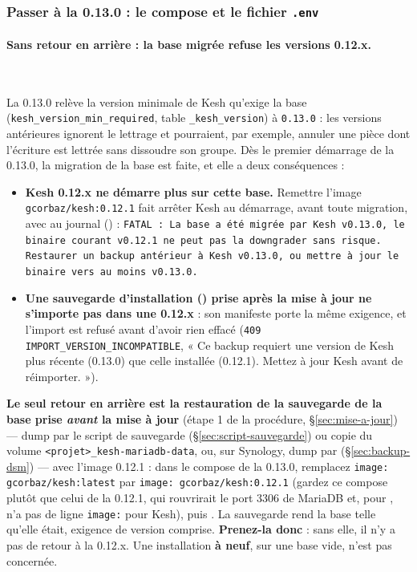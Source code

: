 \documentclass[a4paper,11pt,oneside]{article}
\begin{document}
\subsubsection{Passer à la 0.13.0 : le compose et le fichier \texttt{.env}}\label{sec:maj-0-13}

\paragraph{Sans retour en arrière : la base migrée refuse les versions 0.12.x.}\label{sec:maj-0-13-sans-retour}\mbox{}\\
\begin{sloppypar}
La 0.13.0 relève la version minimale de Kesh qu'exige la base (\texttt{kesh\_version\_min\_required}, table \texttt{\_kesh\_version}) à \texttt{0.13.0} : les versions antérieures ignorent le lettrage et pourraient, par exemple, annuler une pièce dont l'écriture est lettrée sans dissoudre son groupe. Dès le premier démarrage de la 0.13.0, la migration de la base est faite, et elle a deux conséquences :
\end{sloppypar}
\begin{itemize}
    \item \textbf{Kesh 0.12.x ne démarre plus sur cette base.} Remettre l'image \texttt{gcorbaz/kesh:0.12.1} fait arrêter Kesh au démarrage, avant toute migration, avec au journal () : \texttt{FATAL : La base a été migrée par Kesh v0.13.0, le binaire courant v0.12.1 ne peut pas la downgrader sans risque. Restaurer un backup antérieur à Kesh v0.13.0, ou mettre à jour le binaire vers au moins v0.13.0.}
    \item \textbf{Une sauvegarde d'installation () prise après la mise à jour ne s'importe pas dans une 0.12.x} : son manifeste porte la même exigence, et l'import est refusé avant d'avoir rien effacé (\texttt{409 IMPORT\_VERSION\_INCOMPATIBLE}, « Ce backup requiert une version de Kesh plus récente (0.13.0) que celle installée (0.12.1). Mettez à jour Kesh avant de réimporter. »).
\end{itemize}
\begin{keshwarning}
\textbf{Le seul retour en arrière est la restauration de la sauvegarde de la base prise \emph{avant} la mise à jour} (étape 1 de la procédure, \S\ref{sec:mise-a-jour}) --- dump par le script de sauvegarde (\S\ref{sec:script-sauvegarde}) ou copie du volume \texttt{<projet>\_kesh-mariadb-data}, ou, sur Synology, dump par  (\S\ref{sec:backup-dsm}) --- avec l'image 0.12.1 : dans le compose de la 0.13.0, remplacez \texttt{image: gcorbaz/kesh:latest} par \texttt{image: gcorbaz/kesh:0.12.1} (gardez ce compose plutôt que celui de la 0.12.1, qui rouvrirait le port 3306 de MariaDB et, pour , n'a pas de ligne \texttt{image:} pour Kesh), puis . La sauvegarde rend la base telle qu'elle était, exigence de version comprise. \textbf{Prenez-la donc} : sans elle, il n'y a pas de retour à la 0.12.x. Une installation \textbf{à neuf}, sur une base vide, n'est pas concernée.
\end{keshwarning}
\end{document}
